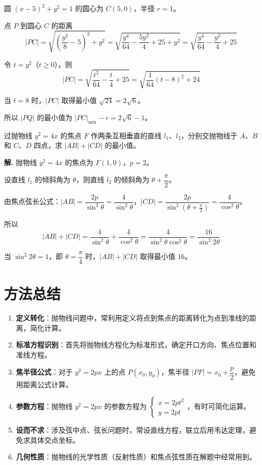 \documentclass[11pt]{ctexrep}
\begin{document}
圆 $(x - 5)^2 + y^2 = 1$ 的圆心为 $C(5, 0)$，半径 $r = 1$。

点 $P$ 到圆心 $C$ 的距离
\[
    |PC| = \sqrt{\left(\frac{y^2}{8} - 5\right)^2 + y^2} = \sqrt{\frac{y^4}{64} - \frac{5y^2}{4} + 25 + y^2} = \sqrt{\frac{y^4}{64} - \frac{y^2}{4} + 25}
\]

令 $t = y^2$（$t \geq 0$），则
\[
    |PC| = \sqrt{\frac{t^2}{64} - \frac{t}{4} + 25} = \sqrt{\frac{1}{64}(t - 8)^2 + 24}
\]

当 $t = 8$ 时，$|PC|$ 取得最小值 $\sqrt{24} = 2\sqrt{6}$。

所以 $|PQ|$ 的最小值为 $|PC|_{\min} - r = 2\sqrt{6} - 1$。

\begin{example}[抛物线的焦点弦问题]
    过抛物线 $y^2 = 4x$ 的焦点 $F$ 作两条互相垂直的直线 $l_1$、$l_2$，分别交抛物线于 $A$、$B$ 和 $C$、$D$ 四点，求 $|AB| + |CD|$ 的最小值。
\end{example}

\textbf{解.} 抛物线 $y^2 = 4x$ 的焦点为 $F(1, 0)$，$p = 2$。

设直线 $l_1$ 的倾斜角为 $\theta$，则直线 $l_2$ 的倾斜角为 $\theta + \dfrac{\pi}{2}$。

由焦点弦长公式：$|AB| = \dfrac{2p}{\sin^2\theta} = \dfrac{4}{\sin^2\theta}$，$|CD| = \dfrac{2p}{\sin^2(\theta + \frac{\pi}{2})} = \dfrac{4}{\cos^2\theta}$。

所以
\[
    |AB| + |CD| = \frac{4}{\sin^2\theta} + \frac{4}{\cos^2\theta} = \frac{4}{\sin^2\theta\cos^2\theta} = \frac{16}{\sin^2 2\theta}
\]

当 $\sin^2 2\theta = 1$，即 $\theta = \dfrac{\pi}{4}$ 时，$|AB| + |CD|$ 取得最小值 $16$。

\section*{方法总结}

\begin{enumerate}
    \item \textbf{定义转化}：抛物线问题中，常利用定义将点到焦点的距离转化为点到准线的距离，简化计算。
    
    \item \textbf{标准方程识别}：首先将抛物线方程化为标准形式，确定开口方向、焦点位置和准线方程。
    
    \item \textbf{焦半径公式}：对于 $y^2 = 2px$ 上的点 $P(x_0, y_0)$，焦半径 $|PF| = x_0 + \dfrac{p}{2}$，避免用距离公式计算。
    
    \item \textbf{参数方程}：抛物线 $y^2 = 2px$ 的参数方程为 $\begin{cases} x = 2pt^2 \\ y = 2pt \end{cases}$，有时可简化运算。
    
    \item \textbf{设而不求}：涉及弦中点、弦长问题时，常设直线方程，联立后用韦达定理，避免求具体交点坐标。
    
    \item \textbf{几何性质}：抛物线的光学性质（反射性质）和焦点弦性质在解题中经常用到。
\end{enumerate}
\end{document}
